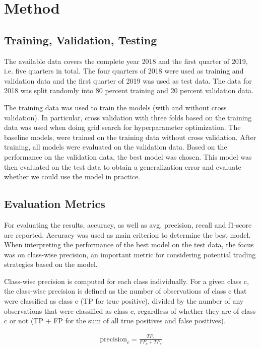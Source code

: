 \documentclass{article}
\begin{document}
	\section{Method}
	
	\subsection{Training, Validation, Testing}
	
	The available data covers the complete year 2018 and the first quarter of 2019, i.e. five quarters in total. The four quarters of 2018 were used as training and validation data and the first quarter of 2019 was used as test data. The data for 2018 was split randomly into 80 percent training and 20 percent validation data. 
	
	The training data was used to train the models (with and without cross validation). In particular, cross validation with three folds based on the training data was used when doing grid search for hyperparameter optimization. The baseline models, were trained on the training data without cross validation. After training, all models were evaluated on the validation data. Based on the performance on the validation data, the best model was chosen. This model was then evaluated on the test data to obtain a generalization error and evaluate whether we could use the model in practice. 
	
	\subsection{Evaluation Metrics}
	
	For evaluating the results, accuracy, as well as avg. precision, recall and f1-score are reported. Accuracy was used as main criterion to determine the best model. When interpreting the performance of the best model on the test data, the focus was on class-wise precision, an important metric for considering potential trading strategies based on the model.
	
	Class-wise precision is computed for each class individually. For a given class c, the class-wise precision is defined as the number of observations of class c that were classified as class c (TP for true positive), divided by the number of any observations that were classified as class c, regardless of whether they are of class c or not (TP + FP for the sum of all true positives and false positives).
	
	\begin{align}
	\mathrm{precision}_c = \frac{TP_c}{FP_c + TP_c}
	\end{align}
	
\end{document}
